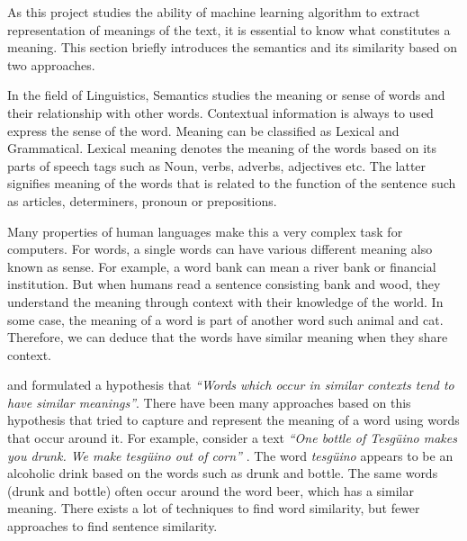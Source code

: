 \documentclass[12pt]{report} %
\begin{document}
	As this project studies the ability of machine learning algorithm to extract representation of meanings of the text, it is essential to know what constitutes a meaning. This section briefly introduces the semantics and its similarity based on two approaches.
	
	In the field of Linguistics, Semantics studies the meaning or sense of words and their relationship with other words. Contextual information is always to used express the sense of the word. Meaning can be classified as Lexical and Grammatical. Lexical meaning denotes the meaning of the words based on its parts of speech tags such as Noun, verbs, adverbs, adjectives etc. The latter signifies meaning of the words that is related to the function of the sentence such as articles, determiners, pronoun or prepositions.
	
	
	Many properties of human languages make this a very complex task for computers. For words, a single words can have various different meaning also known as sense. For example, a word bank can mean a river bank or financial institution. But when humans read a sentence consisting bank and wood, they understand the meaning through context with their knowledge of the world. In some case, the meaning of a word is part of another word such animal and cat. Therefore, we can deduce that the words have similar meaning when they share context.
	
	\cite{harris1970distributional} and \cite{firth1957synopsis} formulated a hypothesis that \textit{ \textquotedblleft Words which occur in similar contexts tend to have similar meanings\textquotedblright}. There have been many approaches based on this hypothesis that tried to capture and represent the meaning of a word using words that occur around it. For example, consider a text \textit{ \textquotedblleft One bottle of Tesgüino makes you drunk. We make tesgüino out of corn\textquotedblright} \citep{jurafsky2014speech}.  The word \textit{tesgüino}  appears to be an alcoholic drink based on the words such as drunk and bottle. The same words (drunk and bottle) often occur around the word beer, which has a similar meaning. There exists a lot of techniques to find word similarity, but fewer approaches to find sentence similarity.
	
	
\end{document}
